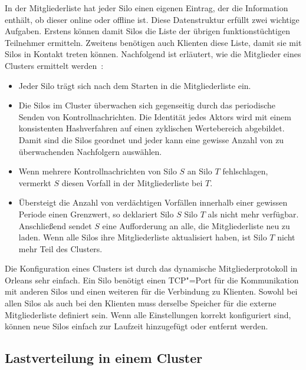 In der Mitgliederliste hat jeder Silo einen eigenen Eintrag, der \zB die Information enthält, ob dieser online oder offline ist. Diese Datenstruktur erfüllt zwei wichtige Aufgaben. Erstens können damit Silos die Liste der übrigen funktionstüchtigen Teilnehmer ermitteln. Zweitens benötigen auch Klienten diese Liste, damit sie mit Silos in Kontakt treten können. Nachfolgend ist erläutert, wie die Mitglieder eines Clusters ermittelt werden~\cite{Bernstein2014}:

\begin{itemize}
	\item Jeder Silo trägt sich nach dem Starten in die Mitgliederliste ein.
	\item Die Silos im Cluster überwachen sich gegenseitig durch das periodische Senden von Kontrollnachrichten. Die Identität jedes Aktors wird mit einem konsistenten Hashverfahren auf einen zyklischen Wertebereich abgebildet. Damit sind die Silos geordnet und jeder kann eine gewisse Anzahl von zu überwachenden Nachfolgern auswählen.
	\item Wenn mehrere Kontrollnachrichten von Silo $S$ an Silo $T$ fehlschlagen, vermerkt $S$ diesen Vorfall in der Mitgliederliste bei $T$.
	\item Übersteigt die Anzahl von verdächtigen Vorfällen innerhalb einer gewissen Periode einen Grenzwert, so deklariert Silo $S$ Silo $T$ als nicht mehr verfügbar. Anschließend sendet $S$ eine Aufforderung an alle, die Mitgliederliste neu zu laden. Wenn alle Silos ihre Mitgliederliste aktualisiert haben, ist Silo $T$ nicht mehr Teil des Clusters.
\end{itemize}

Die Konfiguration eines Clusters ist durch das dynamische Mitgliederprotokoll in Orleans sehr einfach. Ein Silo benötigt einen TCP"=Port für die Kommunikation mit anderen Silos und einen weiteren für die Verbindung zu Klienten. Sowohl bei allen Silos als auch bei den Klienten muss derselbe Speicher für die externe Mitgliederliste definiert sein. Wenn alle Einstellungen korrekt konfiguriert sind, können neue Silos einfach zur Laufzeit hinzugefügt oder entfernt werden.

\subsection{Lastverteilung in einem Cluster}

